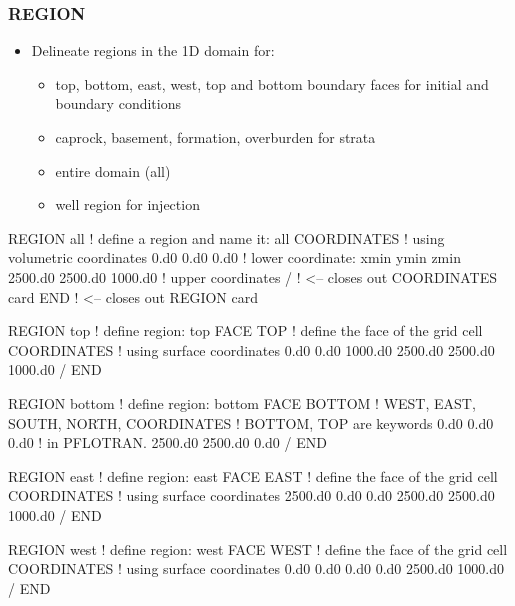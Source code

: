 \documentclass{beamer}
\newcommand\redcomment[1]{{{\color{red} #1}}}
\newcommand\bluecomment[1]{{{\color{blue} #1}}}
\newcommand\greencomment[1]{{{\color{green} #1}}}
\begin{document}
\begin{frame}\frametitle{REGION}

\begin{itemize}
  \item Delineate regions in the 1D domain for:
  \begin{itemize}
    \item top, bottom, east, west, top and bottom boundary faces for initial and boundary conditions
    \item caprock, basement, formation, overburden for strata
    \item entire domain (all)
    \item well region for injection
  \end{itemize}
\end{itemize}

\begin{semiverbatim}
REGION all            \bluecomment{! define a region and name it: \greencomment{all}}
  COORDINATES         \bluecomment{! using \redcomment{volumetric} coordinates}
    0.d0 0.d0 0.d0    \bluecomment{! lower coordinate: xmin ymin zmin}
    2500.d0 2500.d0 1000.d0  \bluecomment{! upper coordinates}
  /   \bluecomment{! <-- closes out COORDINATES card}
END   \bluecomment{! <-- closes out REGION card}

\newpage
REGION top            \bluecomment{! define region:} \greencomment{top}
  FACE TOP            \bluecomment{! define the face of the grid cell}
  COORDINATES         \bluecomment{! using \redcomment{surface} coordinates}
    0.d0 0.d0 1000.d0
    2500.d0 2500.d0 1000.d0
  /
END

REGION bottom         \bluecomment{! define region:} \greencomment{bottom}
  FACE BOTTOM         \redcomment{! WEST, EAST, SOUTH, NORTH,}
  COORDINATES         \redcomment{!   BOTTOM, TOP} \bluecomment{ are keywords}
    0.d0 0.d0 0.d0    \bluecomment{!   in PFLOTRAN.}
    2500.d0 2500.d0 0.d0
  /
END

REGION east            \bluecomment{! define region:} \greencomment{east}
  FACE EAST            \bluecomment{! define the face of the grid cell}
  COORDINATES          \bluecomment{! using \redcomment{surface} coordinates}
    2500.d0 0.d0 0.d0
    2500.d0 2500.d0 1000.d0
  /
END

REGION west            \bluecomment{! define region:} \greencomment{west}
  FACE WEST            \bluecomment{! define the face of the grid cell}
  COORDINATES          \bluecomment{! using \redcomment{surface} coordinates}
    0.d0 0.d0 0.d0
    0.d0 2500.d0 1000.d0
  /
END


\end{semiverbatim}
\end{frame}
\end{document}
